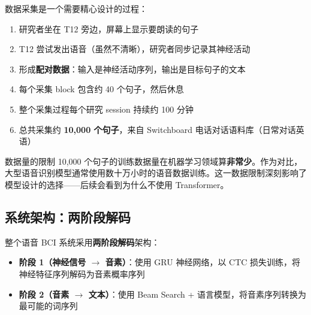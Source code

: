 \documentclass[a4paper]{article}
\begin{document}
数据采集是一个需要精心设计的过程：

\begin{enumerate}
    \item 研究者坐在 T12 旁边，屏幕上显示要朗读的句子
    \item T12 尝试发出语音（虽然不清晰），研究者同步记录其神经活动
    \item 形成\textbf{配对数据}：输入是神经活动序列，输出是目标句子的文本
    \item 每个采集 block 包含约 40 个句子，然后休息
    \item 整个采集过程每个研究 session 持续约 100 分钟
    \item 总共采集约 \textbf{10,000 个句子}，来自 Switchboard 电话对话语料库（日常对话英语）
\end{enumerate}

\begin{importantbox}{数据量的限制}
10,000 个句子的训练数据量在机器学习领域算\textbf{非常少}。作为对比，大型语音识别模型通常使用数十万小时的语音数据训练。这一数据限制深刻影响了模型设计的选择——后续会看到为什么不使用 Transformer。
\end{importantbox}

\subsection{系统架构：两阶段解码}

整个语音 BCI 系统采用\textbf{两阶段解码}架构：

\begin{center}
\end{center}

\begin{itemize}
    \item \textbf{阶段 1（神经信号 $\rightarrow$ 音素）}：使用 GRU 神经网络，以 CTC 损失训练，将神经特征序列解码为音素概率序列
    \item \textbf{阶段 2（音素 $\rightarrow$ 文本）}：使用 Beam Search + 语言模型，将音素序列转换为最可能的词序列
\end{itemize}
\end{document}
